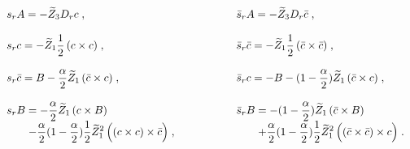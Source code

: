 \begin{equation}
\begin{array}{l@{\hskip 20mm}l}
s_r A = - \widetilde Z_3 D_r c \; , &  
\bar s_r A = - \widetilde Z_3 D_r \bar c \; ,\\
&\\
\displaystyle 
s_r c = - \widetilde Z_1 \frac{1}{2} \, (c \times c ) \; ,&
\displaystyle 
\bar s_r \bar c = - \widetilde Z_1  \frac{1}{2} \, (\bar c\times \bar c) \; , \\
&\\
\displaystyle 
s_r \bar c = B - \frac \alpha 2 \widetilde Z_1   \, (\bar c\times c) \; ,  & 
\displaystyle
\bar s_r c = - B - (1-\frac \alpha 2 ) \widetilde Z_1   \, (\bar c\times c) 
\; , \\
&\\
\displaystyle  
s_r B =  - \frac \alpha 2  \widetilde Z_1   \, (c\times B ) &
\displaystyle
\bar s_r B = - (1-\frac \alpha 2 ) \widetilde Z_1   \, (\bar c\times B ) \\
\displaystyle 
\qquad - \frac \alpha 2 (1-\frac \alpha 2 )
\frac{1}{2} {\widetilde Z}_1^2  \, \Big( ( c \times c ) \times\bar c\Big) \; ,&
\displaystyle  
\qquad  +\frac \alpha 2 (1-\frac \alpha 2 )
\frac{1}{2} {\widetilde Z}_1^2  \, \Big( (\bar c \times \bar c )  
\times c\Big) \; .
\end{array} 
\label{realBRS}
\end{equation}

